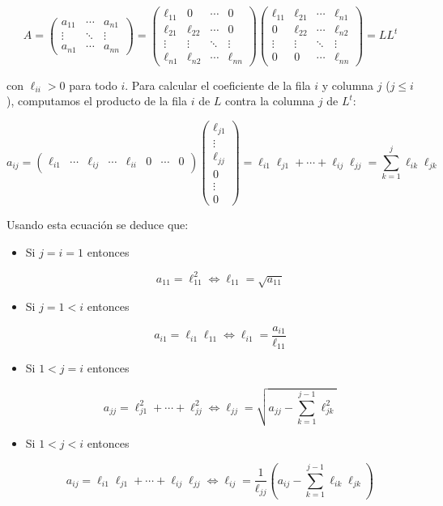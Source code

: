 \[
A = \begin{pmatrix}
a_{11} & \cdots & a_{n1} \\
\vdots & \ddots & \vdots \\
a_{n1} & \cdots & a_{nn}
\end{pmatrix} =
\begin{pmatrix}
\ell_{11} & 0 & \cdots & 0 \\
\ell_{21} & \ell_{22} & \cdots & 0 \\
\vdots & \vdots & \ddots & \vdots \\
\ell_{n1} & \ell_{n2} & \cdots & \ell_{nn}
\end{pmatrix}
\begin{pmatrix}
\ell_{11} 	& \ell_{21}	& \cdots & \ell_{n1} \\
0		 	& \ell_{22} 	& \cdots & \ell_{n2} \\
\vdots 		& \vdots 	& \ddots & \vdots \\
0		 	& 0			& \cdots & \ell_{nn}
\end{pmatrix} = LL^t
\]

con $\ell_{ii} > 0$ para todo $i$. Para calcular el coeficiente de la fila $i$ y columna $j$ ($j \leq i$), computamos el producto de la fila $i$ de $L$ contra la columna $j$ de $L^t$:

\[a_{ij} = \begin{pmatrix}
\ell_{i1} & \cdots & \ell_{ij} & \cdots & \ell_{ii} & 0 & \cdots & 0
\end{pmatrix}
\begin{pmatrix}
\ell_{j1} \\
\vdots \\
\ell_{jj} \\
0 \\
\vdots \\
0
\end{pmatrix} = \ell_{i1}\ell_{j1} + \cdots + \ell_{ij}\ell_{jj} = \sum_{k = 1}^j \ell_{ik}\ell_{jk}\]

Usando esta ecuación se deduce que:

\begin{itemize}
\item Si $j = i = 1$ entonces

\[a_{11} = \ell_{11}^2 \Leftrightarrow \ell_{11} = \sqrt{a_{11}}\]

\item Si $j = 1 < i$ entonces

\[a_{i1} = \ell_{i1}\ell_{11} \Leftrightarrow \ell_{i1} = \frac{a_{i1}}{\ell_{11}}\]

\item Si $1 < j = i$ entonces

\[a_{jj} = \ell_{j1}^2 + \cdots + \ell_{jj}^2 \Leftrightarrow \ell_{jj} = \sqrt{a_{jj} - \sum_{k = 1}^{j - 1}\ell_{jk}^2}\]

\item Si $1 < j < i$ entonces

\[a_{ij} = \ell_{i1}\ell_{j1} + \cdots + \ell_{ij}\ell_{jj} \Leftrightarrow \ell_{ij} = \frac{1}{\ell_{jj}}\left(a_{ij} - \sum_{k = 1}^{j - 1}\ell_{ik}\ell_{jk}\right)\]

\end{itemize}

